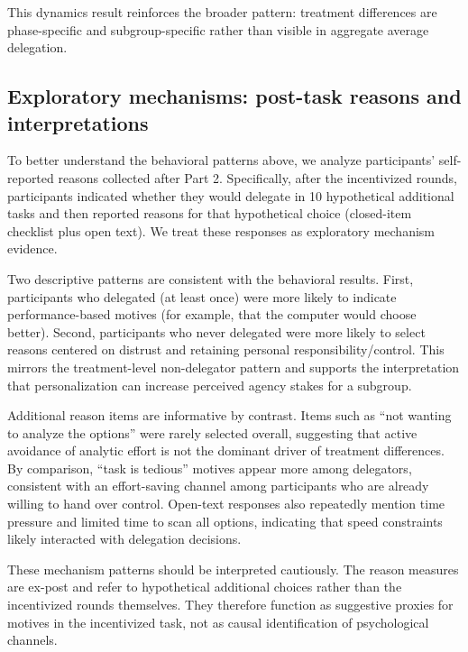 \documentclass[a4paper, 12pt, fleqn]{article}
\theoremstyle{definition}
\begin{document}
This dynamics result reinforces the broader pattern: treatment differences are phase-specific and subgroup-specific rather than visible in aggregate average delegation.

\subsection{Exploratory mechanisms: post-task reasons and interpretations}
\label{sec:exploratory_mechanisms}
To better understand the behavioral patterns above, we analyze participants' self-reported reasons collected after Part 2. Specifically, after the incentivized rounds, participants indicated whether they would delegate in 10 hypothetical additional tasks and then reported reasons for that hypothetical choice (closed-item checklist plus open text). We treat these responses as exploratory mechanism evidence.

Two descriptive patterns are consistent with the behavioral results. First, participants who delegated (at least once) were more likely to indicate performance-based motives (for example, that the computer would choose better). Second, participants who never delegated were more likely to select reasons centered on distrust and retaining personal responsibility/control. This mirrors the treatment-level non-delegator pattern and supports the interpretation that personalization can increase perceived agency stakes for a subgroup.

Additional reason items are informative by contrast. Items such as ``not wanting to analyze the options'' were rarely selected overall, suggesting that active avoidance of analytic effort is not the dominant driver of treatment differences. By comparison, ``task is tedious'' motives appear more among delegators, consistent with an effort-saving channel among participants who are already willing to hand over control. Open-text responses also repeatedly mention time pressure and limited time to scan all options, indicating that speed constraints likely interacted with delegation decisions.

These mechanism patterns should be interpreted cautiously. The reason measures are ex-post and refer to hypothetical additional choices rather than the incentivized rounds themselves. They therefore function as suggestive proxies for motives in the incentivized task, not as causal identification of psychological channels.

\end{document}
